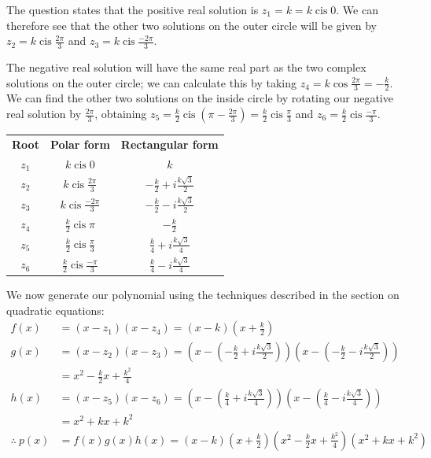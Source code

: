 \documentclass[a4paper,10pt,titlepage]{article}
\theoremstyle{definition}
\DeclareMathOperator{\cis}{cis}
\begin{document}
The question states that the positive real solution is $ z_1 = k = k \cis 0 $. We
can therefore see that the other two solutions on the outer circle will be given
by $ z_2 = k \cis \frac{2\pi}{3} $ and $ z_3 = k \cis \frac{-2\pi}{3} $.

The negative real solution will have the same real part as the two complex solutions
on the outer circle; we can calculate this by taking $ z_4 = k \cos \frac{2\pi}{3} = -\frac{k}{2} $.
We can find the other two solutions on the inside circle by rotating our negative
real solution by $ \frac{2\pi}{3} $, obtaining $ z_5 = \frac{k}{2} \cis (\pi - \frac{2\pi}{3}) = \frac{k}{2} \cis \frac{\pi}{3} $
and $ z_6 = \frac{k}{2} \cis \frac{-\pi}{3} $.

\begin{center}
\begin{tabular} {c | c | c}
  \textbf{Root} & \textbf{Polar form} & \textbf{Rectangular form}\\
  $ z_1 $ & $ k \cis 0 $                         & $ k $\\
  $ z_2 $ & $ k \cis \frac{2\pi}{3} $            & $ -\frac{k}{2} + i\frac{k\sqrt{3}}{2} $\\
  $ z_3 $ & $ k \cis \frac{-2\pi}{3} $           & $ -\frac{k}{2} - i\frac{k\sqrt{3}}{2} $\\
  $ z_4 $ & $ \frac{k}{2} \cis \pi $             & $ -\frac{k}{2} $\\
  $ z_5 $ & $ \frac{k}{2} \cis \frac{\pi}{3} $   & $ \frac{k}{4} + i\frac{k\sqrt{3}}{4} $\\
  $ z_6 $ & $ \frac{k}{2} \cis \frac{-\pi}{3} $   & $ \frac{k}{4} - i\frac{k\sqrt{3}}{4} $\\
\end{tabular}
\end{center}

We now generate our polynomial using the techniques described in the section on
quadratic equations:
\begin{align*}
  f(x) &= (x - z_1)(x - z_4) = \left(x -k\right)\left(x + \frac{k}{2}\right)\\
  g(x) &= (x - z_2)(x - z_3) = \left(x - \left(-\frac{k}{2} + i\frac{k\sqrt{3}}{2}\right)\right)\left(x - \left(-\frac{k}{2} - i\frac{k\sqrt{3}}{2}\right)\right)\\
       &= x^2 - \frac{k}{2}x + \frac{k^2}{4}\\
  h(x) &= (x - z_5)(x - z_6) = \left(x - \left(\frac{k}{4} + i\frac{k\sqrt{3}}{4}\right)\right)\left(x - \left(\frac{k}{4} - i\frac{k\sqrt{3}}{4}\right)\right)\\
       &= x^2 + kx + k^2\\
  \therefore~p(x) &= f(x)g(x)h(x) = \left(x -k\right)\left(x + \frac{k}{2}\right)\left(x^2 - \frac{k}{2}x + \frac{k^2}{4}\right)\left(x^2 + kx + k^2\right)
\end{align*}
\end{document}
